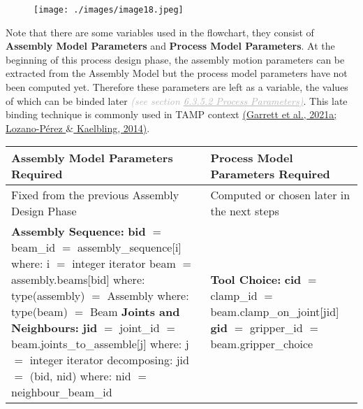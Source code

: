 \begin{figure}[H]
\texttt{[image: ./images/image18.jpeg]}
\end{figure}


Note that there are some variables used in the flowchart, they consist of \textbf{Assembly Model Parameters} and \textbf{Process Model Parameters}. At the beginning of this process design phase, the assembly motion parameters can be extracted from the Assembly Model but the process model parameters have not been computed yet. Therefore these parameters are left as a variable, the values of which can be binded later \textit{\textcolor[HTML]{B7B7B7}{(see section \uline{6.3.5.2 Process Parameters)}}}. This late binding technique is commonly used in TAMP context \href{https://www.zotero.org/google-docs/?svi3ss}{(Garrett et al., 2021a; Lozano-Pérez $\&$ Kaelbling, 2014)}.

\begin{table}[H]
\begin{adjustbox}{max width=\textwidth}
\begin{tabular}{p{7.91cm}p{7.97cm}}
\hline
\multicolumn{1}{|p{7.91cm}}{{\footnotesize \textbf{Assembly Model Parameters Required}}} & 
\multicolumn{1}{|p{7.97cm}|}{{\footnotesize \textbf{Process Model Parameters Required}}} \\ 
\hline
\multicolumn{1}{|p{7.91cm}}{{\footnotesize Fixed from the previous Assembly Design Phase}} & 
\multicolumn{1}{|p{7.97cm}|}{{\footnotesize Computed or chosen later in the next steps}} \\ 
\hline
\multicolumn{1}{|p{7.91cm}}{{\footnotesize \textbf{Assembly Sequence:}} \newline
{\footnotesize \textbf{bid }$=$ beam\_id $=$ assembly\_sequence[i]} \newline
{\footnotesize     where: i $=$ integer iterator} \newline
{\footnotesize beam $=$ assembly.beams[bid]} \newline
{\footnotesize     where: type(assembly) $=$ Assembly} \newline
{\footnotesize     where: type(beam) $=$ Beam} \newline
{\footnotesize \textbf{Joints and Neighbours:}} \newline
{\footnotesize \textbf{jid }$=$ joint\_id $=$ beam.joints\_to\_assemble[j] } \newline
{\footnotesize     where: j $=$ integer iterator} \newline
{\footnotesize     decomposing: jid $=$ (bid, nid)} \newline
{\footnotesize     where: nid $=$ neighbour\_beam\_id}} & 
\multicolumn{1}{|p{7.97cm}|}{{\footnotesize \textbf{Tool Choice:}} \newline
{\footnotesize \textbf{cid }$=$ clamp\_id $=$ beam.clamp\_on\_joint[jid]} \newline
{\footnotesize \textbf{gid }$=$ gripper\_id $=$ beam.gripper\_choice}} \\ 
\hline
\end{tabular}
\end{adjustbox}
\end{table}

